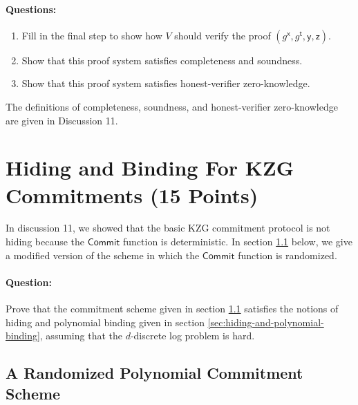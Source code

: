 \documentclass[11pt]{article}
\newcommand{\sft}{\mathsf{t}}
\newcommand{\sfx}{\mathsf{x}}
\newcommand{\sfy}{\mathsf{y}}
\newcommand{\sfz}{\mathsf{z}}
\numberwithin{equation}{section}
\begin{document}
\paragraph{Questions:} 
\begin{enumerate}
    \item Fill in the final step to show how $V$ should verify the proof $(g^\sfx,g^{\sft}, \sfy, \sfz)$.
    \item Show that this proof system satisfies completeness and soundness.
    \item Show that this proof system satisfies honest-verifier zero-knowledge.
\end{enumerate}

The definitions of completeness, soundness, and honest-verifier zero-knowledge are given in Discussion 11.
\pagebreak


\section{Hiding and Binding For KZG Commitments (15 Points)}
In discussion 11, we showed that the basic KZG commitment protocol is not hiding because the $\mathsf{Commit}$ function is deterministic. In section \ref{sec:randomized-KZG-commitment-construction} below, we give a modified version of the scheme in which the $\mathsf{Commit}$ function is randomized.

\paragraph{Question:} Prove that the commitment scheme given in section \ref{sec:randomized-KZG-commitment-construction} satisfies the notions of hiding and polynomial binding given in section \ref{sec:hiding-and-polynomial-binding}, assuming that the $d$-discrete log problem is hard.

\subsection{A Randomized Polynomial Commitment Scheme}\label{sec:randomized-KZG-commitment-construction}
\end{document}
